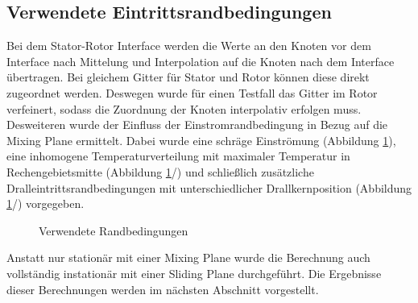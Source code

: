 \subsection{Verwendete Eintrittsrandbedingungen}
\label{subsec:kanalrandbedingungen}
Bei dem Stator-Rotor Interface werden die Werte an den Knoten vor dem Interface nach Mittelung und Interpolation auf die Knoten nach dem Interface übertragen. Bei gleichem Gitter für Stator und Rotor können diese direkt zugeordnet werden. Deswegen wurde für einen Testfall das Gitter im Rotor verfeinert, sodass die Zuordnung der Knoten interpolativ erfolgen muss.\newline
Desweiteren wurde der Einfluss der Einstromrandbedingung in Bezug auf die Mixing Plane ermittelt. Dabei wurde eine schräge Einströmung (Abbildung \ref{fig:randbedingungen}), eine inhomogene Temperaturverteilung mit maximaler Temperatur in Rechengebietsmitte (Abbildung \ref{fig:randbedingungen}/) und schließlich zusätzliche Dralleintrittsrandbedingungen mit unterschiedlicher Drallkernposition (Abbildung \ref{fig:randbedingungen}/) vorgegeben.
\begin{figure}[H]
\centering
\caption{Verwendete Randbedingungen}
\label{fig:randbedingungen}
\end{figure} 
Anstatt nur stationär mit einer Mixing Plane wurde die Berechnung auch vollständig instationär mit einer Sliding Plane durchgeführt. Die Ergebnisse dieser Berechnungen werden im nächsten Abschnitt vorgestellt.
